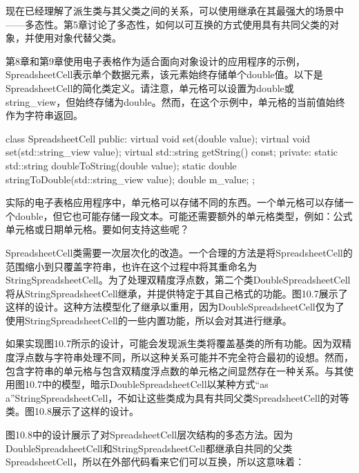 
现在已经理解了派生类与其父类之间的关系，可以使用继承在其最强大的场景中——多态性。第5章讨论了多态性，如何以可互换的方式使用具有共同父类的对象，并使用对象代替父类。


第8章和第9章使用电子表格作为适合面向对象设计的应用程序的示例，SpreadsheetCell表示单个数据元素，该元素始终存储单个double值。以下是SpreadsheetCell的简化类定义。请注意，单元格可以设置为double或string\_view，但始终存储为double。然而，在这个示例中，单元格的当前值始终作为字符串返回。

\begin{cpp}
class SpreadsheetCell
{
    public:
        virtual void set(double value);
        virtual void set(std::string_view value);
        virtual std::string getString() const;
    private:
        static std::string doubleToString(double value);
        static double stringToDouble(std::string_view value);
        double m_value;
};
\end{cpp}

实际的电子表格应用程序中，单元格可以存储不同的东西。一个单元格可以存储一个double，但它也可能存储一段文本。可能还需要额外的单元格类型，例如：公式单元格或日期单元格。要如何支持这些呢？


SpreadsheetCell类需要一次层次化的改造。一个合理的方法是将SpreadsheetCell的范围缩小到只覆盖字符串，也许在这个过程中将其重命名为StringSpreadsheetCell。为了处理双精度浮点数，第二个类DoubleSpreadsheetCell将从StringSpreadsheetCell继承，并提供特定于其自己格式的功能。图10.7展示了这样的设计。这种方法模型化了继承以重用，因为DoubleSpreadsheetCell仅为了使用StringSpreadsheetCell的一些内置功能，所以会对其进行继承。


如果实现图10.7所示的设计，可能会发现派生类将覆盖基类的所有功能。因为双精度浮点数与字符串处理不同，所以这种关系可能并不完全符合最初的设想。然而，包含字符串的单元格与包含双精度浮点数的单元格之间显然存在一种关系。与其使用图10.7中的模型，暗示DoubleSpreadsheetCell以某种方式“as a”StringSpreadsheetCell，不如让这些类成为具有共同父类SpreadsheetCell的对等类。图10.8展示了这样的设计。


图10.8中的设计展示了对SpreadsheetCell层次结构的多态方法。因为DoubleSpreadsheetCell和StringSpreadsheetCell都继承自共同的父类SpreadsheetCell，所以在外部代码看来它们可以互换，所以这意味着：

